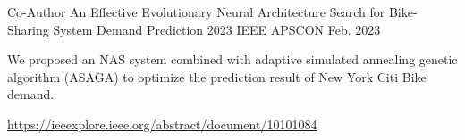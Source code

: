 

\begin{cventries}

  \cventry
    {Co-Author} %
    {An Effective Evolutionary Neural Architecture Search for Bike-Sharing System Demand Prediction} %
    {2023 IEEE APSCON} %
    {Feb. 2023} %
    {
      \begin{cvitems} %
        \item {We proposed an NAS system combined with adaptive 
        simulated annealing genetic algorithm (ASAGA) to optimize 
        the prediction result of New York Citi Bike demand.}
        \item {\url{https://ieeexplore.ieee.org/abstract/document/10101084}}
      \end{cvitems}
    }


\end{cventries}
